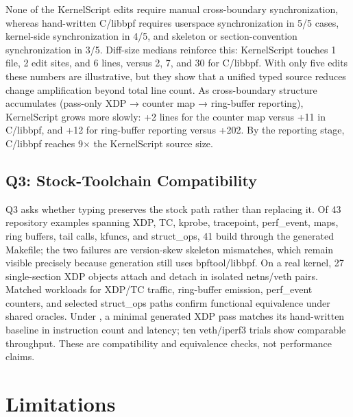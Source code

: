 \documentclass[sigplan,10pt,nonacm]{acmart}
\newcommand{\tool}{KernelScript}
\newcommand{\code}[1]{\texttt{\detokenize{#1}}}
\begin{document}
None of the \tool{} edits require manual cross-boundary synchronization, whereas hand-written C/libbpf requires userspace synchronization in 5/5 cases, kernel-side synchronization in 4/5, and skeleton or section-convention synchronization in 3/5.
Diff-size medians reinforce this: \tool{} touches 1 file, 2 edit sites, and 6 lines, versus 2, 7, and 30 for C/libbpf.
With only five edits these numbers are illustrative, but they show that a unified typed source reduces change amplification beyond total line count.
As cross-boundary structure accumulates (pass-only XDP → counter map → ring-buffer reporting), \tool{} grows more slowly: +2 lines for the counter map versus +11 in C/libbpf, and +12 for ring-buffer reporting versus +202.
By the reporting stage, C/libbpf reaches 9$\times$ the \tool{} source size.

\subsection{Q3: Stock-Toolchain Compatibility}
\label{sec:eval:q3}

Q3 asks whether typing preserves the stock path rather than replacing it. Of 43 repository examples spanning XDP, TC, kprobe, tracepoint, perf\_event, maps, ring buffers, tail calls, kfuncs, and struct\_ops, 41 build through the generated Makefile; the two failures are version-skew skeleton mismatches, which remain visible precisely because generation still uses bpftool/libbpf. On a real kernel, 27 single-section XDP objects attach and detach in isolated netns/veth pairs. Matched workloads for XDP/TC traffic, ring-buffer emission, perf\_event counters, and selected struct\_ops paths confirm functional equivalence under shared oracles. Under \code{BPF_PROG_TEST_RUN}, a minimal generated XDP pass matches its hand-written baseline in instruction count and latency; ten veth/iperf3 trials show comparable throughput. These are compatibility and equivalence checks, not performance claims.

\section{Limitations}
\label{sec:limits}
\end{document}
